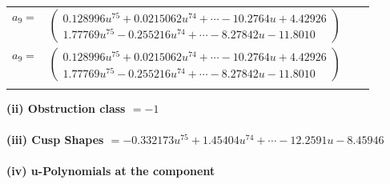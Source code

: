 \documentclass[1p]{elsarticle_modified}
\theoremstyle{definition}
\begin{document}
\begin{tabular}{m{7pt} m{180pt} m{7pt} m{180pt} }
\flushright $a_{9}=$&$\begin{pmatrix}0.128996 u^{75}+0.0215062 u^{74}+\cdots-10.2764 u+4.42926\\1.77769 u^{75}-0.255216 u^{74}+\cdots-8.27842 u-11.8010\end{pmatrix}$\\ \flushright $a_{9}=$&$\begin{pmatrix}0.128996 u^{75}+0.0215062 u^{74}+\cdots-10.2764 u+4.42926\\1.77769 u^{75}-0.255216 u^{74}+\cdots-8.27842 u-11.8010\end{pmatrix}$\\&\end{tabular}
\flushleft \textbf{(ii) Obstruction class $= -1$}\\~\\
\flushleft \textbf{(iii) Cusp Shapes $= -0.332173 u^{75}+1.45404 u^{74}+\cdots-12.2591 u-8.45946$}\\~\\
\newpage\renewcommand{\arraystretch}{1}
\flushleft \textbf{(iv) u-Polynomials at the component}\newline \\
\end{document}
